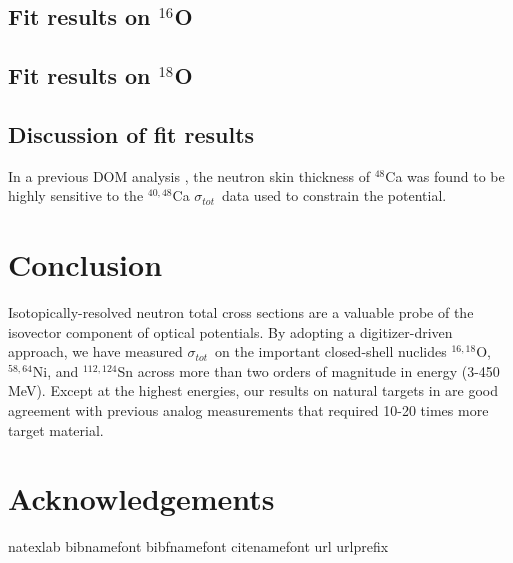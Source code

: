 \documentclass[twocolumn,secnumarabic,amssymb, nobibnotes, aps, prl,
superscriptaddress, nobalancelastpage]{revtex4}
\newcommand{\tot}{\ensuremath{\sigma_{tot}}}
\begin{document}
\subsection{Fit results on $^{16}$O}
\subsection{Fit results on $^{18}$O}

\subsection{Discussion of fit results}

In a previous DOM analysis \cite{}, the neutron skin thickness of $^{48}$Ca was
found to be highly sensitive to the $^{40,48}$Ca \tot\ data used to constrain
the potential. 

\section{Conclusion}
Isotopically-resolved neutron total cross sections are a valuable probe of the
isovector component of optical potentials. By adopting a digitizer-driven
approach, we have measured \tot\ on the important closed-shell nuclides
$^{16,18}$O, $^{58,64}$Ni, and $^{112,124}$Sn across more than two orders of
magnitude in energy (3-450 MeV). Except at the highest energies, our results
on natural targets in are good agreement with previous analog measurements
that required 10-20 times more target material. 

\section{Acknowledgements}


\begin{thebibliography}{32} \expandafter\ifx\csname
        natexlab\endcsname\relax\def\natexlab#1{#1}\fi \expandafter\ifx\csname
        bibnamefont\endcsname\relax \def\bibnamefont#1{#1}\fi
        \expandafter\ifx\csname bibfnamefont\endcsname\relax
        \def\bibfnamefont#1{#1}\fi \expandafter\ifx\csname
        citenamefont\endcsname\relax \def\citenamefont#1{#1}\fi
        \expandafter\ifx\csname url\endcsname\relax \def\url#1{\texttt{#1}}\fi
        \expandafter\ifx\csname urlprefix\endcsname\relax\def\urlprefix{URL
        }\fi \providecommand{\bibinfo}[2]{#2}
        \providecommand{\eprint}[2][]{\url{#2}}

\end{thebibliography}
\end{document}
